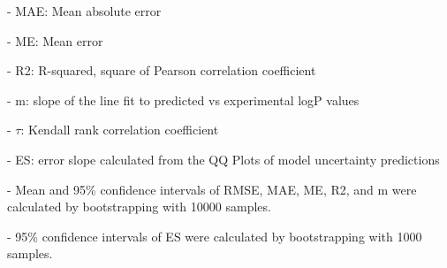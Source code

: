 \documentclass{article}
\begin{document}
- MAE: Mean absolute error

- ME: Mean error

- R2: R-squared, square of Pearson correlation coefficient

- m: slope of the line fit to predicted vs experimental logP values

- $\tau$:  Kendall rank correlation coefficient

- ES: error slope calculated from the QQ Plots of model uncertainty predictions

- Mean and 95\% confidence intervals of RMSE, MAE, ME, R2, and m were calculated by bootstrapping with 10000 samples.

- 95\% confidence intervals of ES were calculated by bootstrapping with 1000 samples.\end{document}
\end{document}
